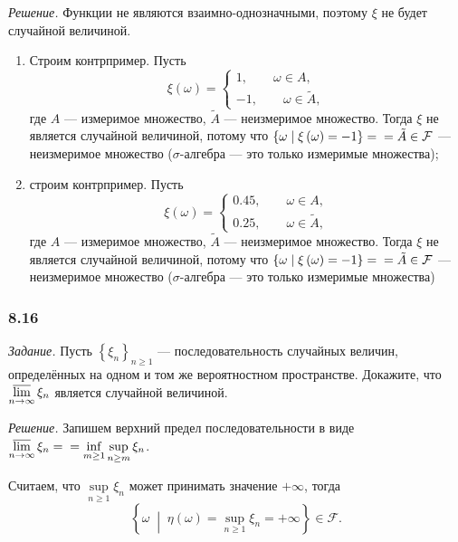 \textit{Решение.} Функции не являются взаимно-однозначными, поэтому $ \xi $ не будет случайной величиной.
\begin{enumerate}[label=\alph*)]
\item Строим контрпример.
Пусть
$$ \xi \left( \omega \right) =
\begin{cases}
1, \qquad \omega \in A, \\
- 1, \qquad \omega \in \tilde{A},
\end{cases}
$$
где $A$ --- измеримое множество, $ \tilde{A} $ --- неизмеримое множество.
Тогда $ \xi $ не является случайной величиной,
потому что $ \left\{ \omega \; \middle| \; \xi \left( \omega \right) = - 1 \right\} = \\
= \tilde{A} \in \mathcal{F} $ ---
неизмеримое множество ($ \sigma $-алгебра --- это только измеримые множества);
\item строим контрпример.
Пусть
$$ \xi \left( \omega \right) =
\begin{cases}
0.45, \qquad \omega \in A, \\
0.25, \qquad \omega \in \tilde{A},
\end{cases}
$$
где $A$ --- измеримое множество, $ \tilde{A} $ --- неизмеримое множество.
Тогда $ \xi $ не является случайной величиной,
потому что $ \left\{ \omega \; \middle| \; \xi \left( \omega \right) = - 1 \right\} = \\
= \tilde{A} \in \mathcal{F} $ ---
неизмеримое множество ($ \sigma $-алгебра --- это только измеримые множества)
\end{enumerate}

\subsubsection*{8.16}

\textit{Задание.} Пусть $ \left\{ \xi_n \right\}_{n \geq 1} $ --- последовательность случайных величин, определённых на одном и том же вероятностном пространстве.
Докажите, что $ \varlimsup \limits_{n \rightarrow \infty } \xi_n $ является случайной величиной. 

\textit{Решение.}
Запишем верхний предел последовательности в виде $ \varlimsup \limits_{n \rightarrow \infty } \xi_n = \\
= \inf \limits_{m \geq 1} \sup \limits_{n \geq m} \xi_n$.

Считаем, что $ \sup \limits_{n \geq 1} \xi_n $ может принимать значение $+ \infty $,
тогда
$$ \left\{ \omega \; \middle| \; \eta \left( \omega \right) =
\sup \limits_{n \geq 1} \xi_n =
+ \infty \right\} \in \mathcal{F}.$$

